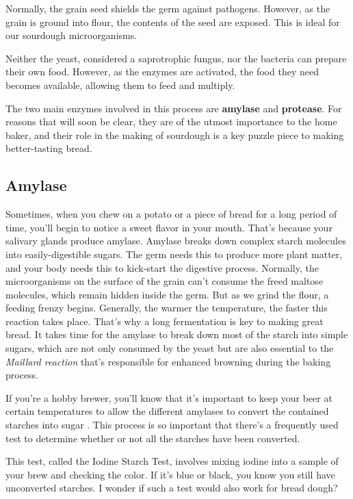 Normally, the grain seed shields the germ against pathogens. However, as the
grain is ground into flour, the contents of the seed are exposed. This is ideal
for our sourdough microorganisms.

Neither the yeast, considered a saprotrophic fungus, nor the bacteria can
prepare their own food. However, as the enzymes are activated, the food they
need becomes available, allowing them to feed and multiply.

The two main enzymes involved in this process are \textbf{amylase} and
\textbf{protease}. For reasons that will soon be clear, they are of the utmost
importance to the home baker, and their role in the making of sourdough is a
key puzzle piece to making better-tasting bread.

\subsection{Amylase}

Sometimes, when you chew on a potato or a piece of bread
for a long period of time, you'll begin to notice a sweet flavor in
your mouth. That's because your salivary glands produce amylase.
Amylase breaks down complex starch molecules into easily-digestible
sugars. The germ needs this to produce more plant matter, and your body
needs this to kick-start the digestive process. Normally, the microorganisms
on the surface of the grain can't consume the freed maltose molecules,
which remain hidden inside the germ. But as we grind the flour, a feeding
frenzy begins. Generally, the warmer the temperature, the faster this
reaction takes place. That's why a long fermentation is key to making
great bread. It takes time for the amylase to break down most of
the starch into simple sugars, which are not only consumed by the
yeast but are also essential to the \textit{Maillard reaction}
that's responsible for enhanced browning during the baking process.

If you're a hobby brewer, you'll know that it's important to keep
your beer at certain temperatures to allow the different amylases to
convert the contained starches into sugar \cite{beer+amylase}. This
process is so important that there's a frequently used test to
determine whether or not all the starches have been converted.

This test, called the Iodine Starch Test, involves mixing iodine into
a sample of your brew and checking the color. If it's blue or black,
you know you still have unconverted starches. I wonder if such a test
would also work for bread dough?

